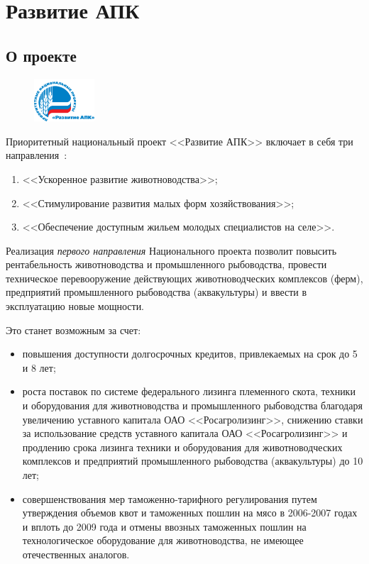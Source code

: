 \documentclass[article, 12pt, russian, oneside]{ncc}
\begin{document}
\section{Развитие АПК}

\subsection{О проекте}

\begin{figure}
  \begin{center}
    \includegraphics[width=0.2\textwidth]{NPR_APK}
  \end{center}
\end{figure}

Приоритетный национальный проект <<Развитие АПК>> включает в себя три
направления~\cite{APK_Problems}:

\begin{enumerate}
\item <<Ускоренное развитие животноводства>>;
\item <<Стимулирование развития малых форм хозяйствования>>;
\item <<Обеспечение доступным жильем молодых специалистов на селе>>.
\end{enumerate}

Реализация \emph{первого направления} Национального проекта позволит
повысить рентабельность животноводства и промышленного рыбоводства,
провести техническое перевооружение действующих животноводческих
комплексов (ферм), предприятий промышленного рыбоводства
(аквакультуры) и ввести в эксплуатацию новые мощности.

Это станет возможным за счет:

\begin{itemize}
\item повышения доступности долгосрочных кредитов, привлекаемых на
  срок до 5 и 8 лет;
\item роста поставок по системе федерального лизинга племенного скота,
  техники и оборудования для животноводства и промышленного
  рыбоводства благодаря увеличению уставного капитала ОАО
  <<Росагролизинг>>, снижению ставки за использование средств
  уставного капитала ОАО <<Росагролизинг>> и продлению срока лизинга
  техники и оборудования для животноводческих комплексов и предприятий
  промышленного рыбоводства (аквакультуры) до 10 лет;
\item совершенствования мер таможенно-тарифного регулирования путем \linebreak
  утверждения объемов квот и таможенных пошлин на мясо в 2006-2007
  годах и вплоть до 2009 года и отмены ввозных таможенных пошлин на
  технологическое оборудование для животноводства, не имеющее
  отечественных аналогов.
\end{itemize}
\end{document}
